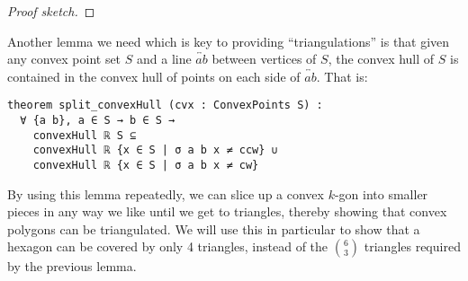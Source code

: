 \begin{proof}[Proof sketch]
\end{proof}

Another lemma we need which is key to providing ``triangulations'' is that given any convex point set $S$ and a line $\overleftrightarrow{ab}$ between vertices of $S$, the convex hull of $S$ is contained in the convex hull of points on each side of $\overleftrightarrow{ab}$. That is:
\begin{lstlisting}
theorem split_convexHull (cvx : ConvexPoints S) :
  ∀ {a b}, a ∈ S → b ∈ S →
    convexHull ℝ S ⊆
    convexHull ℝ {x ∈ S | σ a b x ≠ ccw} ∪
    convexHull ℝ {x ∈ S | σ a b x ≠ cw}
\end{lstlisting}
By using this lemma repeatedly, we can slice up a convex $k$-gon into smaller pieces in any way we like until we get to triangles, thereby showing that convex polygons can be triangulated. We will use this in particular to show that a hexagon can be covered by only 4 triangles, instead of the ${6\choose 3}$ triangles required by the previous lemma.

